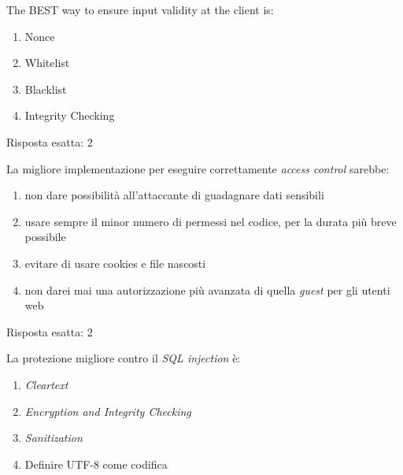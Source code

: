 \begin{Exercise} [
  title={Quiz},
  label={esControlli5}
  ]

  \Question The BEST way to ensure input validity at the client is:
  \begin{enumerate}
\item Nonce
\item Whitelist
\item Blacklist
\item Integrity Checking
\end{enumerate}
  

\end{Exercise}

\begin{Answer} [
  ref={esControlli5},
  number={5}
  ]

  \Question Risposta esatta: 2
\end{Answer}


\begin{Exercise} [
  title={Quiz},
  label={esControlli6}
  ]

  \Question La migliore implementazione per eseguire correttamente 
\textit{access control} sarebbe:
\begin{enumerate}
 \item non dare possibilità all'attaccante di guadagnare dati sensibili
 \item usare sempre il minor numero di permessi nel codice, per la durata più 
breve possibile
 \item evitare di usare cookies e file nascosti
 \item non darei mai una autorizzazione più avanzata di quella \textit{guest} 
per gli utenti web
\end{enumerate}

\end{Exercise}

\begin{Answer} [
  ref={esControlli6},
  number={6}
  ]

  \Question Risposta esatta: 2
\end{Answer}


\begin{Exercise} [
  title={Quiz},
  label={esControlli7}
  ]

  \Question La protezione migliore contro il \textit{SQL injection} è:
  \begin{enumerate}
    \item \textit{Cleartext}
    \item \textit{Encryption and Integrity Checking}
    \item \textit{Sanitization}
    \item Definire UTF-8 come codifica
  \end{enumerate}
\end{Exercise}

